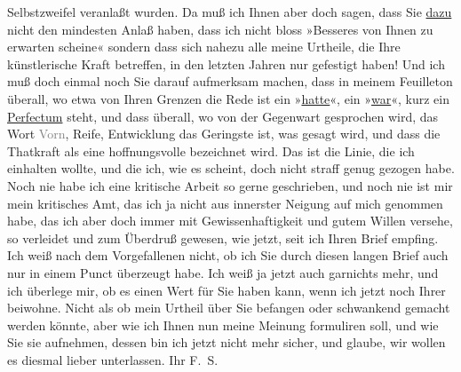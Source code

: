 \begin{ledgroupsized}[t]{13cm}
               Selbstzweifel veranlaßt wurden. Da muß ich Ihnen aber doch sagen, dass Sie \uline{dazu} nicht den mindesten Anlaß haben, dass ich nicht
               bloss »Besseres von Ihnen zu erwarten scheine« sondern dass sich nahezu alle meine
               Urtheile, die Ihre künstlerische Kraft betreffen, in den letzten Jahren nur gefestigt
               haben! Und ich muß {\pb}doch
               einmal noch Sie darauf aufmerksam machen, dass in meinem Feuilleton überall, wo etwa von Ihren
               Grenzen die Rede ist ein »\uline{hatte}«, ein »\uline{war}«, kurz ein \uline{Perfectum} steht, und dass überall, wo von der Gegenwart gesprochen wird, das
               Wort \textcolor{gray}{Vorn}, Reife, Entwicklung das Geringste ist, was gesagt wird,
               und dass die Thatkraft als eine hoffnungsvolle bezeichnet wird. Das ist die Linie,
               die ich einhalten wollte, und die ich, wie es scheint, doch nicht straff genug
               gezogen habe. \pend
           \pstart
           Noch nie habe ich eine kritische Arbeit so gerne geschrieben, und noch nie ist mir
               mein kritisches Amt, das ich ja nicht aus innerster Neigung auf mich genommen habe,
               das ich aber doch immer mit Gewissenhaftigkeit und gutem Willen versehe, so verleidet
               und zum Überdruß gewesen, wie jetzt, seit ich Ihren Brief empfing. \pend
           \pstart
           Ich weiß nach dem Vorgefallenen nicht, ob ich Sie durch diesen langen Brief auch nur
               in einem Punct überzeugt habe. Ich weiß ja jetzt auch garnichts mehr, und ich
               überlege mir, ob es einen Wert für Sie haben kann, wenn ich jetzt noch Ihrer \label{K_L03353-1112v}\label{K_L03353-1112h} beiwohne. Nicht als ob mein Urtheil über Sie befangen oder schwankend gemacht
               werden könnte, aber wie ich Ihnen nun meine Meinung formuliren soll, und wie Sie sie
               aufnehmen, dessen bin ich jetzt nicht mehr sicher, und glaube, wir wollen es diesmal
               lieber unterlassen. \pend
           \pstart Ihr \spacefill\mbox{F. S.}\pend{}
         
         \endnumbering{}\end{ledgroupsized}\begin{anhang}\end{anhang}\newcommand{\dateiname}{L03353}\newcommand{\titel}{Felix Salten an Arthur Schnitzler, [9. 11. 1903]}\newcommand{\editorInnen}{Martin Anton Müller und Laura Untner}
      